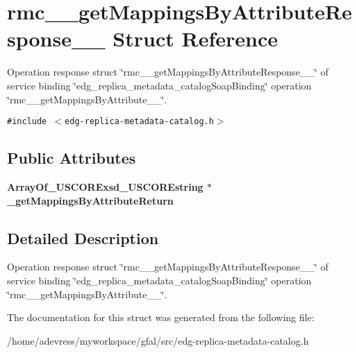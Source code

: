 \section{rmc\_\-\_\-get\-Mappings\-By\-Attribute\-Response\_\-\_\- Struct Reference}
\label{structrmc____getMappingsByAttributeResponse____}
Operation response struct \char`\"{}rmc\_\-\_\-get\-Mappings\-By\-Attribute\-Response\_\-\_\-\char`\"{} of service binding \char`\"{}edg\_\-replica\_\-metadata\_\-catalog\-Soap\-Binding\char`\"{} operation \char`\"{}rmc\_\-\_\-get\-Mappings\-By\-Attribute\_\-\_\-\char`\"{}.  


{\tt \#include $<$edg-replica-metadata-catalog.h$>$}

\subsection*{Public Attributes}
\begin{CompactItemize}
\item 
\bf{Array\-Of\_\-USCORExsd\_\-USCOREstring} $\ast$ \textbf{\_\-get\-Mappings\-By\-Attribute\-Return}\label{structrmc____getMappingsByAttributeResponse_____706e2f98a4964df5b01d3d746c224abb}

\end{CompactItemize}


\subsection{Detailed Description}
Operation response struct \char`\"{}rmc\_\-\_\-get\-Mappings\-By\-Attribute\-Response\_\-\_\-\char`\"{} of service binding \char`\"{}edg\_\-replica\_\-metadata\_\-catalog\-Soap\-Binding\char`\"{} operation \char`\"{}rmc\_\-\_\-get\-Mappings\-By\-Attribute\_\-\_\-\char`\"{}. 



The documentation for this struct was generated from the following file:\begin{CompactItemize}
\item 
/home/adevress/myworkspace/gfal/src/edg-replica-metadata-catalog.h\end{CompactItemize}
